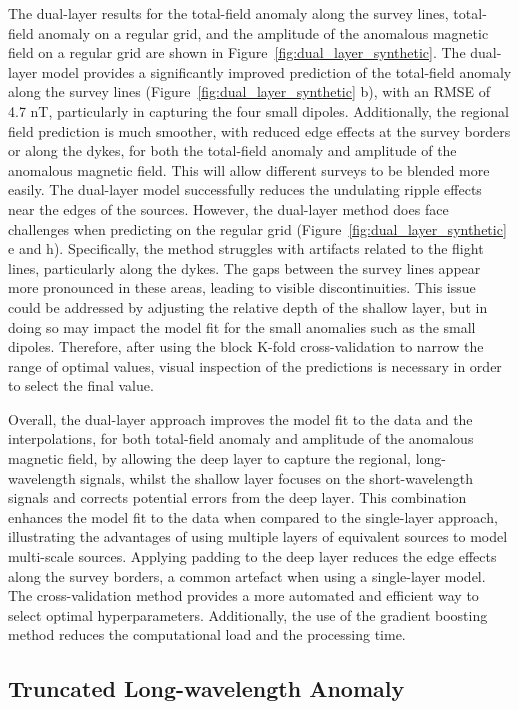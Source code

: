 The dual-layer results for the total-field anomaly along the survey lines, total-field anomaly on a regular grid, and the amplitude of the anomalous magnetic field on a regular grid are shown in Figure~\ref{fig:dual_layer_synthetic}. The dual-layer model provides a significantly improved prediction of the total-field anomaly along the survey lines (Figure~\ref{fig:dual_layer_synthetic} b), with an RMSE of 4.7 nT, particularly in capturing the four small dipoles. Additionally, the regional field prediction is much smoother, with reduced edge effects at the survey borders or along the dykes, for both the total-field anomaly and amplitude of the anomalous magnetic field. This will allow different surveys to be blended more easily. The dual-layer model successfully reduces the undulating ripple effects near the edges of the sources. However, the dual-layer method does face challenges when predicting on the regular grid (Figure~\ref{fig:dual_layer_synthetic} e and h). Specifically, the method struggles with artifacts related to the flight lines, particularly along the dykes. The gaps between the survey lines appear more pronounced in these areas, leading to visible discontinuities. This issue could be addressed by adjusting the relative depth of the shallow layer, but in doing so may impact the model fit for the small anomalies such as the small dipoles. Therefore, after using the block K-fold cross-validation to narrow the range of optimal values, visual inspection of the predictions is necessary in order to select the final value.

Overall, the dual-layer approach improves the model fit to the data and the interpolations, for both total-field anomaly and amplitude of the anomalous magnetic field, by allowing the deep layer to capture the regional, long-wavelength signals, whilst the shallow layer focuses on the short-wavelength signals and corrects potential errors from the deep layer. This combination enhances the model fit to the data when compared to the single-layer approach, illustrating the advantages of using multiple layers of equivalent sources to model multi-scale sources. Applying padding to the deep layer reduces the edge effects along the survey borders, a common artefact when using a single-layer model. The cross-validation method provides a more automated and efficient way to select optimal hyperparameters. Additionally, the use of the gradient boosting method reduces the computational load and the processing time.

\subsection{Truncated Long-wavelength Anomaly}
\label{sec:truncated_regional}

